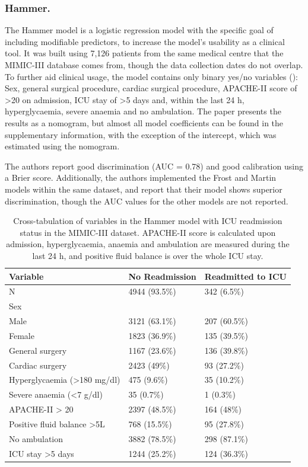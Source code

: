 \documentclass[onecolumn]{article}
\begin{document}
\subsubsection*{Hammer.}

The Hammer model is a logistic regression model with the specific goal of including modifiable predictors, to increase the model's usability as a clinical tool. It was built using 7,126 patients from the same medical centre that the MIMIC-III database comes from, though the data collection dates do not overlap. To further aid clinical usage, the model contains only binary yes/no variables (): Sex, general surgical procedure, cardiac surgical procedure, APACHE-II score of >20 on admission, ICU stay of >5 days and, within the last 24 h, hyperglycaemia, severe anaemia and no ambulation. The paper presents the results as a nomogram, but almost all model coefficients can be found in the supplementary information, with the exception of the intercept, which was estimated using the nomogram.

The authors report good discrimination (AUC = 0.78) and good calibration using a Brier score. Additionally, the authors implemented the Frost and Martin models within the same dataset, and report that their model shows superior discrimination, though the AUC values for the other models are not reported.

\begin{table}[h]
\centering
	\renewcommand{\arraystretch}{1.4}
		\caption{Cross-tabulation of variables in the Hammer model with ICU readmission status in the MIMIC-III dataset. APACHE-II score is calculated upon admission, hyperglycaemia, anaemia and ambulation are measured during the last 24 h, and positive fluid balance is over the whole ICU stay.}
	\begin{tabular}{lp{2.5cm}p{2cm}}
		\hline
		Variable & No Readmission & Readmitted to ICU\\
		\hline
		N & 4944 (93.5\%)  &      342 (6.5\%)\\
		Sex &&\\
		\quad Male & 3121 (63.1\%)   &    207 (60.5\%)\\
		\quad Female & 1823 (36.9\%)  &     135 (39.5\%)\\
		General surgery & 1167 (23.6\%)   &    136 (39.8\%)\\
		Cardiac surgery & 2423 (49\%)     &   93 (27.2\%)\\
		Hyperglycaemia (>180 mg/dl) & 475 (9.6\%)    &    35 (10.2\%)\\
		Severe anaemia (<7 g/dl) & 35 (0.7\%)      &    1 (0.3\%)\\
		APACHE-II > 20 &  2397 (48.5\%)  &       164 (48\%)\\
		Positive fluid balance >5L & 768 (15.5\%)  &      95 (27.8\%)\\
		No ambulation & 3882 (78.5\%)   &    298 (87.1\%)\\
		ICU stay >5 days & 1244 (25.2\%)   &    124 (36.3\%)\\
		\hline
	\end{tabular}
	\label{Table1Hammer}
\end{table}
\end{document}
